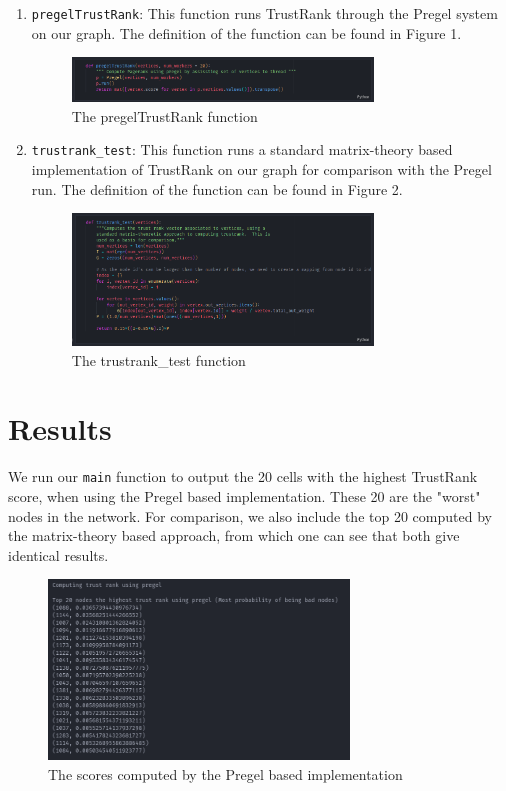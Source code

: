 \documentclass[conference]{IEEEtran}
\begin{document}
\begin{enumerate}
    \item \verb|pregelTrustRank|: This function runs TrustRank through the Pregel system on our graph. The definition of the function can be found in Figure 1.
    \begin{figure}[H]
        \centering
        \includegraphics[width=8cm]{images/pregelTrustRank.png}
        \caption{The pregelTrustRank function}
        \label{fig:my_label}
    \end{figure}
    \item \verb|trustrank_test|: This function runs a standard matrix-theory based implementation of TrustRank on our graph for comparison with the Pregel run. The definition of the function can be found in Figure 2.
    \begin{figure}[H]
        \centering
        \includegraphics[width=8cm]{images/matrixTrustRank.png}
        \caption{The trustrank\_test function}
        \label{fig:my_label}
    \end{figure}
\end{enumerate}

\section{Results}
We run our \verb|main| function to output the 20 cells with the highest TrustRank score, when using the Pregel based implementation. These 20 are the "worst" nodes in the network. For comparison, we also include the top 20 computed by the matrix-theory based approach, from which one can see that both give identical results.
\begin{figure}[H]
    \centering
    \includegraphics[width=8cm]{images/pregelscores.png}
    \caption{The scores computed by the Pregel based implementation}
    \label{fig:my_label}
\end{figure}
\end{document}
